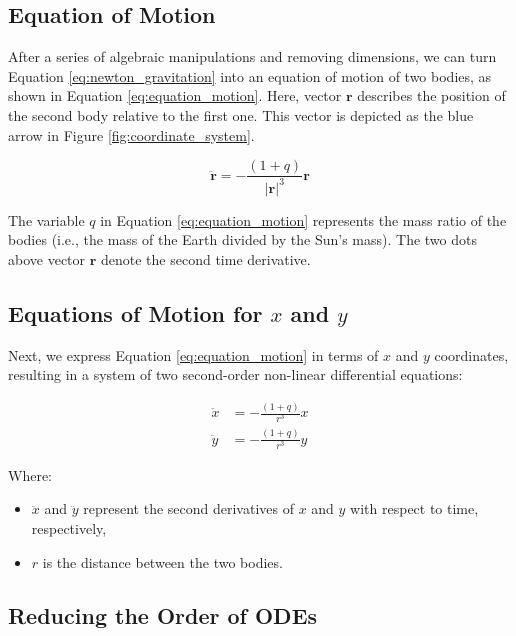\documentclass{article}
\begin{document}
\subsection*{Equation of Motion}

After a series of algebraic manipulations and removing dimensions, we can turn Equation \ref{eq:newton_gravitation} into an equation of motion of two bodies, as shown in Equation \ref{eq:equation_motion}. Here, vector $\mathbf{r}$ describes the position of the second body relative to the first one. This vector is depicted as the blue arrow in Figure \ref{fig:coordinate_system}.

\begin{equation}
    \ddot{\mathbf{r}} = -\frac{{(1 + q)}}{{|\mathbf{r}|^3}} \mathbf{r}
    \label{eq:equation_motion}
\end{equation}

The variable $q$ in Equation \ref{eq:equation_motion} represents the mass ratio of the bodies (i.e., the mass of the Earth divided by the Sun’s mass). The two dots above vector $\mathbf{r}$ denote the second time derivative.

\subsection*{Equations of Motion for \(x\) and \(y\)}

Next, we express Equation \ref{eq:equation_motion} in terms of \(x\) and \(y\) coordinates, resulting in a system of two second-order non-linear differential equations:

\begin{align}
    \ddot{x} &= -\frac{{(1 + q)}}{{r^3}} x \\
    \ddot{y} &= -\frac{{(1 + q)}}{{r^3}} y
    \label{eq:equation_motion_xy}
\end{align}

Where:
\begin{itemize}
    \item \(\ddot{x}\) and \(\ddot{y}\) represent the second derivatives of \(x\) and \(y\) with respect to time, respectively,
    \item \(r\) is the distance between the two bodies.
\end{itemize}

\subsection*{Reducing the Order of ODEs}
\end{document}
